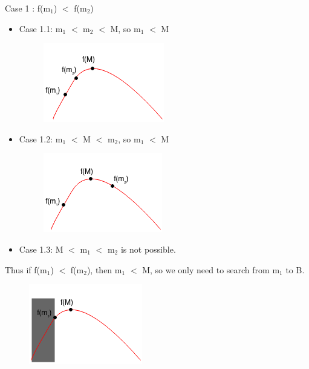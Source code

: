 \documentclass[11pt,oneside]{book}
\makeatletter
\def\maxwidth#1{\ifdim\Gin@nat@width>#1 #1\else\Gin@nat@width\fi}
\makeatother
\begin{document}
Case 1 : f(m$_{1}$) $<$ f(m$_{2}$)

\begin{itemize}
\item Case 1.1:  m$_{1}$ $<$ m$_{2}$ $<$ M, so m$_{1}$ $<$ M

\vspace{5px}\begin{figure}[H]\centering
        \includegraphics[width=0.66\maxwidth{\textwidth}]{ternarycase11.png}
        \end{figure}
\item Case 1.2: m$_{1}$ $<$ M $<$ m$_{2}$, so m$_{1}$ $<$ M

\vspace{5px}\begin{figure}[H]\centering
        \includegraphics[width=0.66\maxwidth{\textwidth}]{ternarycase12.png}
        \end{figure}
\item Case 1.3: M $<$ m$_{1}$ $<$ m$_{2}$ is not possible.
\end{itemize}

Thus if f(m$_{1}$) $<$ f(m$_{2}$), then m$_{1}$ $<$ M, so we only need to search from m$_{1}$ to B.
\vspace{5px}\begin{figure}[H]\centering
        \includegraphics[width=0.66\maxwidth{\textwidth}]{ternarycase1.png}
        \end{figure}
\end{document}
